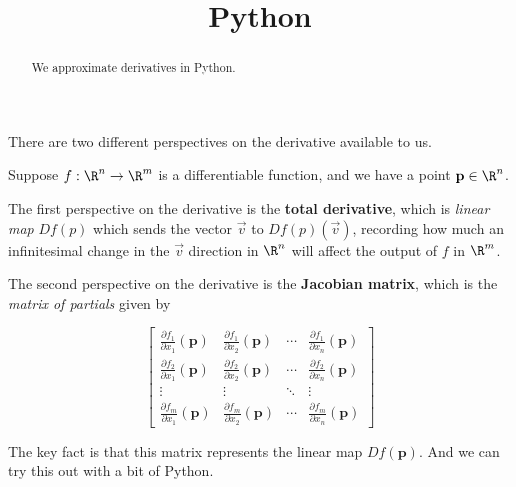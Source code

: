 \documentclass{ximera}
\title{Python}
\begin{document}
\begin{abstract}
  We approximate derivatives in Python.
\end{abstract}

There are two different perspectives on the derivative available to us.

Suppose $f : \R^n \to \R^m$ is a differentiable function, and we have
a point $\mathbf{p} \in \R^n$.

The first perspective on the derivative is the \textbf{total
  derivative}, which is \textit{linear map} $Df(p)$ which sends the
vector $\vec{v}$ to $Df(p)(\vec{v})$, recording how much an
infinitesimal change in the $\vec{v}$ direction in $\R^n$ will affect
the output of $f$ in $\R^m$.

The second perspective on the derivative is the \textbf{Jacobian
  matrix}, which is the \textit{matrix of partials} given by

\[
\begin{bmatrix}
  \frac{\partial f_1}{\partial x_1} \left(\mathbf{p}\right) & \frac{\partial f_1}{\partial x_2} \left(\mathbf{p}\right) & \cdots & \frac{\partial f_1}{\partial x_n}\left(\mathbf{p}\right) \\
  \frac{\partial f_2}{\partial x_1} \left(\mathbf{p}\right) & \frac{\partial f_2}{\partial x_2} \left(\mathbf{p}\right) & \cdots & \frac{\partial f_2}{\partial x_n}\left(\mathbf{p}\right) \\
  \vdots                                                    & \vdots                                                    & \ddots & \vdots \\
  \frac{\partial f_m}{\partial x_1} \left(\mathbf{p}\right) & \frac{\partial f_m}{\partial x_2} \left(\mathbf{p}\right) & \cdots & \frac{\partial f_m}{\partial x_n}\left(\mathbf{p}\right) 
\end{bmatrix}
\]

The key fact is that this matrix represents the linear map $Df(\mathbf{p})$.  And we can try this out with a bit of Python.
\end{document}
